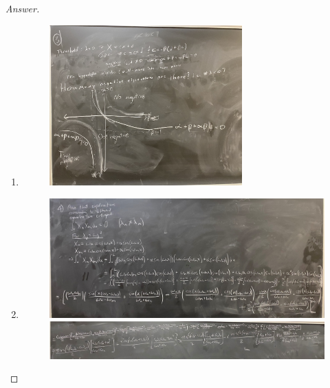 \documentclass{article}
\theoremstyle{definition}
\renewcommand\qedsymbol{$\blacksquare$}
\newenvironment{ans}{\begin{proof}[Answer]\renewcommand{\qedsymbol}{}}{\end{proof}}
\begin{document}
\begin{ans}
\begin{enumerate}
        \item \phantom{.}
        \begin{figure}[H]
            \centering
            \includegraphics[width=0.7\textwidth]{Problem 1-3.jpeg}
        \end{figure}

        \item \phantom{.}
        \begin{figure}[H]
            \centering
            \includegraphics[width=\textwidth]{Problem 1-4.jpeg}
            \includegraphics[width=\textwidth]{Problem 1-4 (2).jpeg}
        \end{figure}

    \end{enumerate}
\end{ans}
\end{document}
